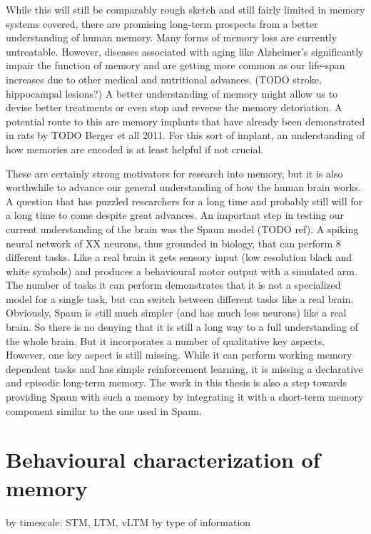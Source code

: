While this will still be comparably rough sketch and still fairly limited in memory systems covered, there are promising long-term prospects from a better understanding of human memory.
Many forms of memory loss are currently untreatable.
However, diseases associated with aging like Alzheimer's significantly impair the function of memory and are getting more common as our life-span increases due to other medical and nutritional advances.
(TODO stroke, hippocampal lesions?)
A better understanding of memory might allow us to devise better treatments or even stop and reverse the memory detoriation.
A potential route to this are memory implants that have already been demonstrated in rats by TODO Berger et all 2011.
For this sort of implant, an understanding of how memories are encoded is at least helpful if not crucial.

These are certainly strong motivators for research into memory, but it is also worthwhile to advance our general understanding of how the human brain works.
A question that has puzzled researchers for a long time and probably still will for a long time to come despite great advances.
An important step in testing our current understanding of the brain was the Spaun model (TODO ref).
A spiking neural network of XX neurons, thus grounded in biology, that can perform 8 different tasks.
Like a real brain it gets sensory input (low resolution black and white symbols) and produces a behavioural motor output with a simulated arm.
The number of tasks it can perform demonstrates that it is not a specialized model for a single task, but can switch between different tasks like a real brain.
Obviously, Spaun is still much simpler (and has much less neurons) like a real brain.
So there is no denying that it is still a long way to a full understanding of the whole brain.
But it incorporates a number of qualitative key aspects.
However, one key aspect is still missing.
While it can perform working memory dependent tasks and has simple reinforcement learning, it is missing a declarative and episodic long-term memory.
The work in this thesis is also a step towards providing Spaun with such a memory by integrating it with a short-term memory component similar to the one used in Spaun.


\section{Behavioural characterization of memory}
by timescale: STM, LTM, vLTM
by type of information

